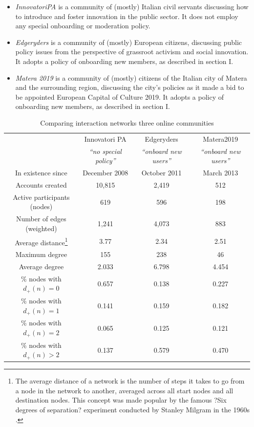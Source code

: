 \documentclass{nws}
\begin{document}
\begin{itemize}
\item \emph{InnovatoriPA} is a community of (mostly) Italian civil servants discussing how to introduce and foster innovation in the public sector. It does not employ any special onboarding or moderation policy.
\item \emph{Edgeryders} is a community of (mostly) European citizens, discussing public policy issues from the perspective of grassroot activism and social innovation. It adopts a policy of onboarding new members, as described in section I.
\item \emph{Matera 2019} is a community of (mostly) citizens of the Italian city of Matera and the surrounding region, discussing the city's policies as it made a bid to be appointed European Capital of Culture 2019. It adopts a policy of onboarding new members, as described in section I.
\end{itemize}


\begin{table}[t]
\centering 
\begin{tabular}{| c | c | c | c |} 
\hline 
& Innovatori PA & Edgeryders & Matera2019\\ 
& \emph{``no special policy''} & \emph{``onboard new users''} & \emph{``onboard new users''}\\ 
\hline 
In existence since & December 2008 & October 2011 & March 2013 \\
Accounts created & 10,815 & 2,419 & 512 \\
\hline 
Active participants (nodes) & 619 & 596 & 198 \\
Number of edges (weighted) & 1,241 & 4,073 & 883 \\
\hline 
Average distance\footnote{The average distance of a network is the number of steps it takes to go from a node in the network to another, averaged across all start nodes and all destination nodes. This concept was made popular by the famous ?Six degrees of separation? experiment conducted by Stanley Milgram in the 1960s \cite{milgram1967small}.} & 3.77 & 2.34 & 2.51 \\
Maximum degree & 155 & 238 & 46 \\
Average degree & 2.033 & 6.798 & 4.454 \\
\hline 
\% nodes with $d_+(n) = 0$ & 0.657 & 0.138 & 0.227 \\
\% nodes with $d_+(n) = 1$ & 0.141 & 0.159 & 0.182 \\
\% nodes with $d_+(n) = 2$ & 0.065 & 0.125 & 0.121 \\
\% nodes with $d_+(n) > 2$ & 0.137 & 0.579 & 0.470 \\
\hline 
\end{tabular}
\caption{Comparing interaction networks three online communities}
\label{table:empiricalData}
\end{table}
\end{document}
